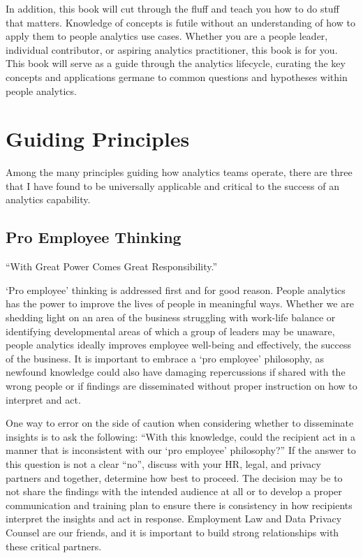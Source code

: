 \documentclass[]{book}
\begin{document}
In addition, this book will cut through the fluff and teach you how to do stuff that matters. Knowledge of concepts is futile without an understanding of how to apply them to people analytics use cases. Whether you are a people leader, individual contributor, or aspiring analytics practitioner, this book is for you. This book will serve as a guide through the analytics lifecycle, curating the key concepts and applications germane to common questions and hypotheses within people analytics.

\hypertarget{guiding-principles}{%
\section{Guiding Principles}\label{guiding-principles}}

Among the many principles guiding how analytics teams operate, there are three that I have found to be universally applicable and critical to the success of an analytics capability.

\hypertarget{pro-employee-thinking}{%
\subsection{Pro Employee Thinking}\label{pro-employee-thinking}}

``With Great Power Comes Great Responsibility.''

`Pro employee' thinking is addressed first and for good reason. People analytics has the power to improve the lives of people in meaningful ways. Whether we are shedding light on an area of the business struggling with work-life balance or identifying developmental areas of which a group of leaders may be unaware, people analytics ideally improves employee well-being and effectively, the success of the business. It is important to embrace a `pro employee' philosophy, as newfound knowledge could also have damaging repercussions if shared with the wrong people or if findings are disseminated without proper instruction on how to interpret and act.

One way to error on the side of caution when considering whether to disseminate insights is to ask the following: ``With this knowledge, could the recipient act in a manner that is inconsistent with our `pro employee' philosophy?'' If the answer to this question is not a clear ``no'', discuss with your HR, legal, and privacy partners and together, determine how best to proceed. The decision may be to not share the findings with the intended audience at all or to develop a proper communication and training plan to ensure there is consistency in how recipients interpret the insights and act in response. Employment Law and Data Privacy Counsel are our friends, and it is important to build strong relationships with these critical partners.
\end{document}
